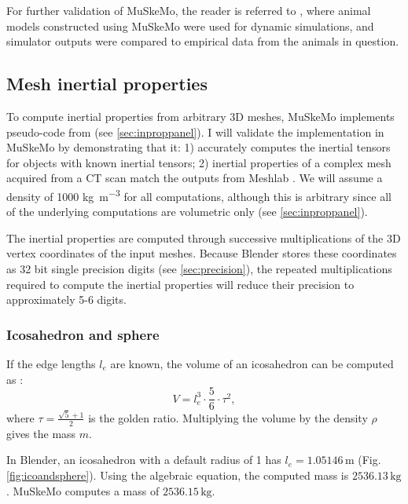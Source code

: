 \documentclass{article}
\begin{document}
For further validation of MuSkeMo, the reader is referred to \cite{vanbijlertMusclecontrolledPhysicsSimulations2024a,vanbijlertMuscleDrivenPredictivePhysics2024}, where animal models constructed using MuSkeMo were used for dynamic simulations, and simulator outputs were compared to empirical data from the animals in question.


\subsection{Mesh inertial properties}
\label{sec:inpropvalidation}
To compute inertial properties from arbitrary 3D meshes, MuSkeMo implements pseudo-code from \cite{eberlyGamePhysics2004} (see \ref{sec:inproppanel}). I will validate the implementation in MuSkeMo by demonstrating that it: 1) accurately computes the inertial tensors for objects with known inertial tensors; 2) inertial properties of a complex mesh acquired from a CT scan match the outputs from Meshlab \cite{cignoniMeshLabOpenSourceMesh2008}. We will assume a density of 1000 \si{kg m^{-3}} for all computations, although this is arbitrary since all of the underlying computations are volumetric only (see \ref{sec:inproppanel}).

The inertial properties are computed through successive multiplications of the 3D vertex coordinates of the input meshes. Because Blender stores these coordinates as 32 bit single precision digits (see \ref{sec:precision}), the repeated multiplications required to compute the inertial properties will reduce their precision to approximately 5-6 digits.

\subsubsection*{Icosahedron and sphere}

If the edge lengths \(l_{e}\) are known, the volume of an icosahedron can be computed as \cite{satterlyMomentsInertiaPolyhedra1958}:
\begin{equation}
V = l_{e}^3 \cdot \frac{5}{6} \cdot \tau^2,
\end{equation}
where \(\tau = \frac{\sqrt{5} + 1}{2}\) is the golden ratio. Multiplying the volume by the density \(\rho\) gives the mass \(m\).

In Blender, an icosahedron with a default radius of 1 has \(l_{e} = 1.05146 \, \si{\metre}\) (Fig. \ref{fig:icoandsphere}). Using the algebraic equation, the computed mass is \(2536.13 \, \si{\kilogram}\). MuSkeMo computes a mass of \(2536.15 \, \si{\kilogram}\). 
\end{document}

